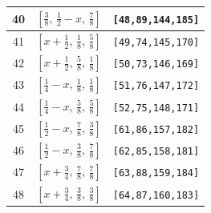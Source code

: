 \documentclass[fleqn,8pt]{jsarticle}
\begin{document}
\begin{longtable}{ccc}
40 & $\left[ \frac{3}{8},\, \frac{1}{2} - x,\, \frac{7}{8} \right]$ & {\tt [48,89,144,185]} \\ \hline
41 & $\left[ x + \frac{1}{2},\, \frac{1}{8},\, \frac{5}{8} \right]$ & {\tt [49,74,145,170]} \\ \hline
42 & $\left[ x + \frac{1}{2},\, \frac{5}{8},\, \frac{1}{8} \right]$ & {\tt [50,73,146,169]} \\ \hline
43 & $\left[ \frac{1}{4} - x,\, \frac{1}{8},\, \frac{1}{8} \right]$ & {\tt [51,76,147,172]} \\ \hline
44 & $\left[ \frac{1}{4} - x,\, \frac{5}{8},\, \frac{5}{8} \right]$ & {\tt [52,75,148,171]} \\ \hline
45 & $\left[ \frac{1}{2} - x,\, \frac{7}{8},\, \frac{3}{8} \right]$ & {\tt [61,86,157,182]} \\ \hline
46 & $\left[ \frac{1}{2} - x,\, \frac{3}{8},\, \frac{7}{8} \right]$ & {\tt [62,85,158,181]} \\ \hline
47 & $\left[ x + \frac{3}{4},\, \frac{7}{8},\, \frac{7}{8} \right]$ & {\tt [63,88,159,184]} \\ \hline
48 & $\left[ x + \frac{3}{4},\, \frac{3}{8},\, \frac{3}{8} \right]$ & {\tt [64,87,160,183]} \\
\end{longtable}
\renewcommand{\arraystretch}{1.2}
\end{document}
